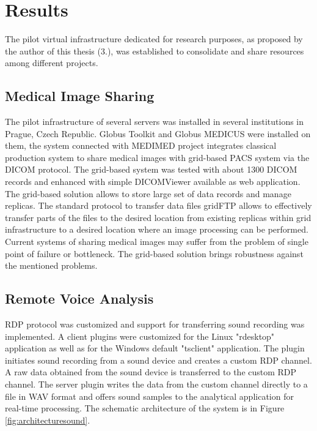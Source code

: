 \chapter{Results}
\label{sec:results}
The pilot virtual infrastructure dedicated for research purposes, as proposed by the author of this thesis (3.), was established to consolidate and share resources among different projects. 
\section{Medical Image Sharing}
\label{sec:resultsimages}

The pilot infrastructure of several servers was installed in several institutions in Prague, Czech Republic. Globus Toolkit and Globus MEDICUS were installed on them,
the system connected with MEDIMED project integrates classical production system to share medical images with grid-based PACS system via the DICOM protocol. The grid-based system was tested with about 1300 DICOM records and enhanced with simple DICOMViewer available as web application. 
The grid-based solution allows to store large set of data records and manage replicas. The standard protocol to transfer data files gridFTP allows to effectively transfer parts of the files to the desired location from existing replicas within grid infrastructure to a desired location where an image processing can be performed. Current systems of sharing medical images may suffer from the problem of single point of failure or bottleneck. The grid-based solution brings robustness against the mentioned problems. 

\section{Remote Voice Analysis}
\label{sec:resultsvoice}

RDP protocol was customized and support for transferring sound recording was implemented. A client plugins were customized for the Linux "rdesktop" application as well as for the Windows default "tsclient" application. The plugin initiates sound recording from a sound device and creates a custom RDP channel. A raw data obtained from the sound device is transferred to the custom RDP channel. The server plugin writes the data from the custom channel directly to a file in WAV format and offers sound samples to the analytical application for real-time processing. The schematic architecture of the system is in Figure \ref{fig:architecturesound}.

